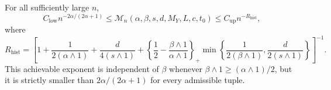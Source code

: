For all sufficiently large \(n\),
\[
C_{\mathrm{low}}n^{-2\alpha/(2\alpha+1)}
\le\mathcal M_n(\alpha,\beta,s,d,M_Y,L,c,t_0)
\le C_{\mathrm{up}}n^{-R_{\mathrm{hist}}},
\]
where
\[
R_{\mathrm{hist}}=
\left[1+\frac1{2(\alpha\wedge1)}+\frac d{4(s\wedge1)}+
\left\{\frac12-\frac{\beta\wedge1}{\alpha\wedge1}\right\}_+
\min\left\{\frac1{2(\beta\wedge1)},\frac d{2(s\wedge1)}\right\}\right]^{-1}.
\]
This achievable exponent is independent of \(\beta\) whenever \(\beta\wedge1\ge(\alpha\wedge1)/2\), but it is strictly smaller than \(2\alpha/(2\alpha+1)\) for every admissible tuple.